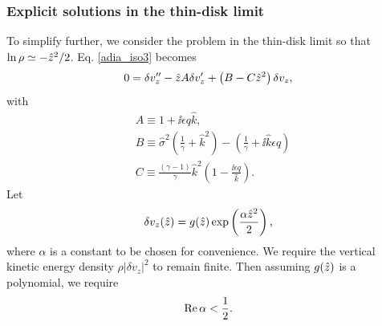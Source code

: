 \subsubsection{Explicit solutions in the thin-disk limit}
To simplify further, we consider the problem in the thin-disk limit so
that $\ln \rho \simeq -\hat{z}^2/2$. Eq. \ref{adia_iso3} becomes 
\begin{align}
  0 = \delta v_z^{\prime\prime} - \hat{z} A \delta v_z^\prime + \left(B
    - C \hat{z}^2\right)\delta v_z,
\end{align}
with
\begin{align}
  &A \equiv 1 + \ii \epsilon q \hat{k},\\
  &B \equiv \hat{\sigma}^2\left(\frac{1}{\gamma} + \hat{k}^2\right) -
  \left(\frac{1}{\gamma} + \ii \hat{k} \epsilon q\right)\\
  &C \equiv \frac{\left(\gamma-1\right)}{\gamma}\hat{k}^2\left(1 - \frac{\ii
      \epsilon q}{\hat{k}}\right).\label{adia_thin}
\end{align}
Let
\begin{align}
  \delta v_z(\hat{z}) =
  g(\hat{z})\exp\left(\frac{\alpha\hat{z}^2}{2}\right), \label{adia_ansatz}
\end{align}
where $\alpha$ is a constant to be chosen for convenience. We require
the vertical kinetic energy density $\rho|\delta v_z|^2$ to remain
finite.  Then assuming
$g(\hat{z})$ is a polynomial, we require 
\begin{align}
  \operatorname{Re}\alpha < \frac{1}{2}. 
\end{align}

